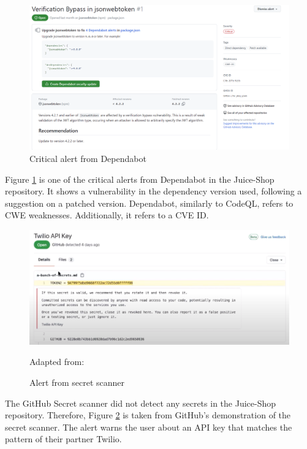 \vspace{2mm}
\begin{figure}[H]
    \centering
    \includegraphics[width=0.8\columnwidth]{Images/dependabotalert.png}
    \caption{Critical alert from Dependabot}
    \label{fig: Critical alert from Dependabot}
\end{figure}

Figure \ref{fig: Critical alert from Dependabot} is one of the critical alerts from Dependabot in the Juice-Shop repository. It shows a vulnerability in the dependency version used, following a suggestion on a patched version. Dependabot, similarly to CodeQL, refers to CWE weaknesses. Additionally, it refers to a CVE ID. 

\vspace{2mm}
\begin{figure}[H]
    \centering
    \includegraphics[width=0.8\columnwidth]{Images/secretscanneralert.png}
    \caption{Alert from secret scanner} Adapted from: \cite{GitHubVideo}
    \label{fig: Alert from secret scanner}
\end{figure}
The GitHub Secret scanner did not detect any secrets in the Juice-Shop repository. Therefore, Figure \ref{fig: Alert from secret scanner} is taken from GitHub's demonstration of the secret scanner. The alert warns the user about an API key that matches the pattern of their partner Twilio. 

